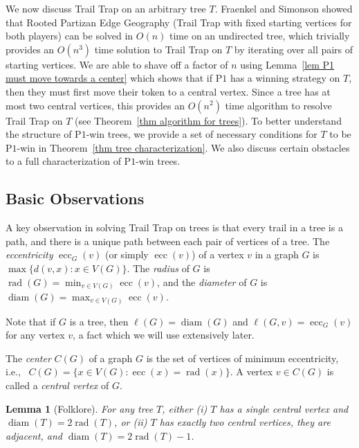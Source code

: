 \documentclass{article}
\theoremstyle{plain}
\newtheorem{lemma}[theorem]{Lemma}
\theoremstyle{definition}
\DeclareMathOperator{\diam}{diam}
\DeclareMathOperator{\ecc}{ecc}
\DeclareMathOperator{\rad}{rad}
\newcommand{\MaxTrail}{\ell}
\def\pone{{\rm{P}\ensuremath{1}}}
\begin{document}
We now discuss {\sc Trail Trap} on an arbitrary tree $T$. Fraenkel and Simonson \cite{FS93} showed that  {\sc Rooted Partizan Edge Geography} ({\sc Trail Trap} with fixed starting vertices for both players) can be solved in $O(n)$ time on an undirected tree, which trivially provides an $O(n^3)$ time solution to {\sc Trail Trap} on $T$ by iterating over all pairs of starting vertices.
We are able to shave off a factor of $n$ using Lemma~\ref{lem P1 must move towards a center} which shows that if \pone{} has a winning strategy on $T$, then they must first move their token to a central vertex.
Since a tree has at most two central vertices, this provides an $O(n^2)$ time algorithm to resolve {\sc Trail Trap} on $T$ (see Theorem~\ref{thm algorithm for trees}).
To better understand the structure of \pone{}-win trees, we provide a set of necessary conditions for $T$ to be \pone{}-win in Theorem~\ref{thm tree characterization}. We also discuss certain obstacles to a full characterization of \pone{}-win trees.

\subsection{Basic Observations}

A key observation in solving {\sc Trail Trap} on trees is that every trail in a tree is a path, and there is a unique path between each pair of vertices of a tree. The {\em eccentricity} $\ecc_G(v)$ (or simply $\ecc(v)$) of a vertex $v$ in a graph $G$ is $\max\{d(v,x) \colon x \in V(G)\}$. The \textit{radius} of $G$ is $\rad(G) = \min_{v\in V(G)} \ecc(v)$, and the {\em diameter} of $G$ is $\diam(G) = \max_{v \in V(G)} \ecc(v)$.

Note that if $G$ is a tree, then $\MaxTrail(G) = \diam(G)$ and $\MaxTrail(G,v) = \ecc_G(v)$ for any vertex $v$, a fact which we will use extensively later.

The \emph{center} $C(G)$ of a graph $G$ is the set of vertices of minimum eccentricity, i.e., \ $C(G) = \{x \in V(G) \colon \ecc(x) = \rad(x) \}$. A vertex $v \in C(G)$ is called a \emph{central vertex} of $G$. 

\begin{lemma}[Folklore]\label{lem trees have one or two centers}
    For any tree $T$, either (i) $T$ has a single central vertex and $\diam(T) = 2\rad(T)$, or (ii) $T$ has exactly two central vertices, they are adjacent, and $\diam(T) = 2\rad(T) - 1$.
\end{lemma}
\end{document}
